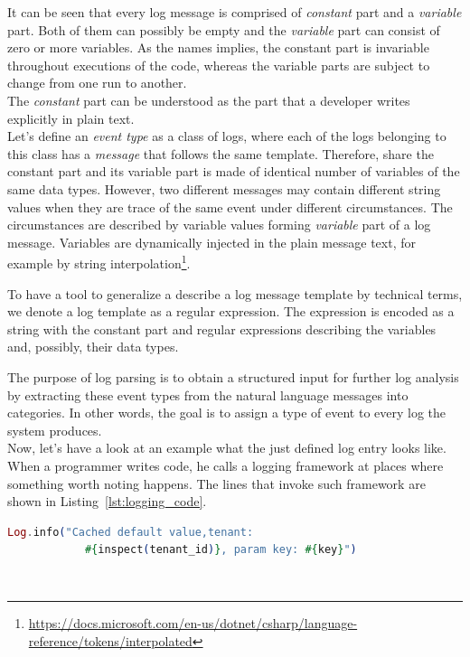 It can be seen that every log message is comprised of \textit{constant} part and a \textit{variable} part. Both of them can possibly be empty and the \textit{variable} part can consist of zero or more variables.
As the names implies, the constant part is invariable throughout executions of the code, whereas the variable parts are subject to change from one run to another.\\
The \textit{constant} part can be understood as the part that a developer writes explicitly in plain text.\\

Let's define an \textit{event type} as a class of logs, where each of the logs belonging to this class has a \textit{message} that follows the same template. Therefore, share the constant part and its variable part is made of identical number of variables of the same data types.
However, two different messages may contain different string values when they are trace of the same event under different circumstances. The circumstances are described by variable values forming \textit{variable} part of a log message. Variables are dynamically injected in the plain message text, for example by string interpolation\footnote{\url{https://docs.microsoft.com/en-us/dotnet/csharp/language-reference/tokens/interpolated}}.

To have a tool to generalize a describe a log message template by technical terms, we denote a log template as a regular expression. The expression is encoded as a string with the constant part and regular expressions describing the variables and, possibly, their data types.

The purpose of log parsing is to obtain a structured input for further log analysis by extracting these event types from the natural language messages into categories.
In other words, the goal is to assign a type of event to every log the system produces.\\

Now, let's have a look at an example what the just defined log entry looks like.
When a programmer writes code, he calls a logging framework at places where something worth noting happens. The lines that invoke such framework are shown in Listing~\ref{lst:logging_code}.\\

\begin{lstlisting}[language=elixir, caption={Example of how logging is done in source code}, captionpos=b, label={lst:logging_code}]
Log.info("Cached default value,tenant: 
            #{inspect(tenant_id)}, param key: #{key}")
\end{lstlisting}
\\

